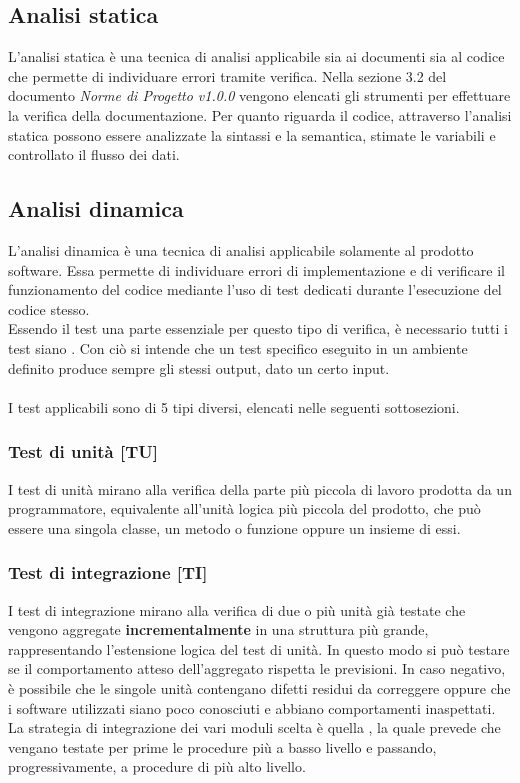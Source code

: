 
\subsection{Analisi statica}
L'analisi statica è una tecnica di analisi applicabile sia ai documenti sia al codice che permette di individuare errori tramite verifica. Nella sezione 3.2 del documento \emph{Norme di Progetto v1.0.0} vengono elencati gli strumenti per effettuare la verifica della documentazione. Per quanto riguarda il codice, attraverso l'analisi statica possono essere analizzate la sintassi e la semantica, stimate le variabili e controllato il flusso dei dati.
\subsection{Analisi dinamica}
L'analisi dinamica è una tecnica di analisi applicabile solamente al prodotto software. Essa permette di individuare errori di implementazione e di verificare il funzionamento del codice mediante l'uso di test dedicati durante l'esecuzione del codice stesso.\\
Essendo il test una parte essenziale per questo tipo di verifica, è necessario tutti i test siano . Con ciò si intende che un test specifico eseguito in un ambiente definito produce sempre gli stessi output, dato un certo input.\\\\
I test applicabili sono di 5 tipi diversi, elencati nelle seguenti sottosezioni.

\subsubsection{Test di unità [TU]}
I test di unità mirano alla verifica della parte più piccola di lavoro prodotta da un programmatore, equivalente all'unità logica più piccola del prodotto, che può essere una singola classe, un metodo o funzione oppure un insieme di essi.
\subsubsection{Test di integrazione [TI]}
I test di integrazione mirano alla verifica di due o più unità già testate che vengono aggregate \textbf{incrementalmente} in una struttura più grande, rappresentando l’estensione logica del test di unità. In questo modo si può testare se il comportamento atteso dell'aggregato rispetta le previsioni. In caso negativo, è possibile che le singole unità contengano difetti residui da correggere oppure che i software utilizzati siano poco conosciuti e abbiano comportamenti inaspettati.\\
La strategia di integrazione dei vari moduli scelta è quella , la quale prevede che vengano testate per prime le procedure più a basso livello e passando, progressivamente, a procedure di più alto livello. 
